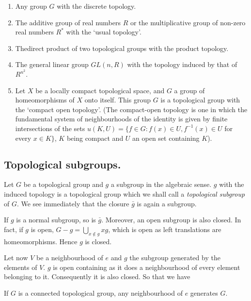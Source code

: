 \bigskip
{}
\begin{enumerate}
\renewcommand{\labelenumi}{(\theenumi)}
\item Any group $G$ with the discrete topology.

\item The additive group of real numbers $R$ or the multiplicative
  group of non-zero real numbers $R^\ast$ with the `usual topology'. 

\item The\pageoriginale direct product of two topological groups with
  the product topology.
 
\item The general linear group $GL(n, R)$ with the topology induced by
  that of $R^{n^2}$. 

\item Let $X$ be a locally compact topological space, and $G$ a group
  of homeomorphisms of $X$ onto itself. This group $G$ is a topological
  group with the `compact open topology'. (The compact-open topology
  is one in which the fundamental system of neighbourhoods of the
  identity is given by finite intersections of the sets $u(K , U)=\{ f
  \in G : f(x) \in U, f^{-1}(x) \in U$ for every $x \in K\}$, $K$ being
  compact and $U$ an open set containing $K$). 
\end{enumerate}

\subsection{Topological subgroups.}\label{chap1-sec1.2}%

Let $G$ be a topological group and $g$ a subgroup in the algebraic
sense. $g$ with the induced topology is a topological group which we
shall call a \textit{topological subgroup} of $G$. We see immediately
that the closure $\bar{g}$ is again a subgroup. 

If $g$ is a normal subgroup, so is $\bar{g}$. Moreover, an open
subgroup is also closed. In fact, if $g$ is open, $G-g=
\bigcup\limits_{x \notin g} xg$, which is open as left translations are
homeomorphisms. Hence $g$ is closed. 

Let now $V$ be a neighbourhood of $e$ and $g$ the subgroup generated
by the elements of $V$. $g$ is open containing as it does a
neighbourhood of every element belonging to it. Consequently it is
also closed. So that we have 

\begin{proposition}\label{chap1-prop2}%
If $G$ is a connected topological group, any neighbourhood of $e$
generates $G$. 
\end{proposition}

